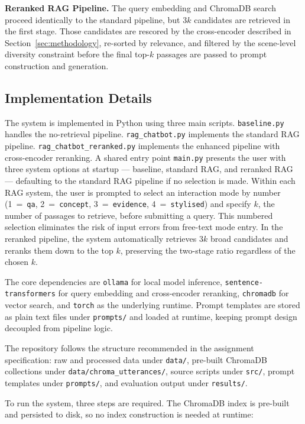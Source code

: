 \documentclass[10pt,conference]{IEEEtran}
\begin{document}
\textbf{Reranked RAG Pipeline.}
The query embedding and ChromaDB search proceed identically to the
standard pipeline, but $3k$ candidates are retrieved in the first
stage. Those candidates are rescored by the cross-encoder described
in Section~\ref{sec:methodology}, re-sorted by relevance, and
filtered by the scene-level diversity constraint before the final
top-$k$ passages are passed to prompt construction and generation.

\subsection{Implementation Details}

The system is implemented in Python using three main scripts.
\texttt{baseline.py} handles the no-retrieval pipeline.
\texttt{rag\_chatbot.py} implements the standard RAG pipeline.
\texttt{rag\_chatbot\_reranked.py} implements the enhanced pipeline
with cross-encoder reranking. A shared entry point \texttt{main.py}
presents the user with three system options at startup ---
baseline, standard RAG, and reranked RAG --- defaulting to the
standard RAG pipeline if no selection is made. Within each RAG
system, the user is prompted to select an interaction mode by
number (1~=~\texttt{qa}, 2~=~\texttt{concept}, 3~=~\texttt{evidence},
4~=~\texttt{stylised}) and specify $k$, the number of passages to
retrieve, before submitting a query. This numbered selection
eliminates the risk of input errors from free-text mode entry. In
the reranked pipeline, the system automatically retrieves $3k$
broad candidates and reranks them down to the top $k$, preserving
the two-stage ratio regardless of the chosen $k$.

The core dependencies are \texttt{ollama} for local model
inference, \texttt{sentence-transformers} for query embedding and
cross-encoder reranking, \texttt{chromadb} for vector search, and
\texttt{torch} as the underlying runtime. Prompt templates are
stored as plain text files under \texttt{prompts/} and loaded at
runtime, keeping prompt design decoupled from pipeline logic.

The repository follows the structure recommended in the assignment
specification: raw and processed data under \texttt{data/},
pre-built ChromaDB collections under
\texttt{data/chroma\_utterances/}, source scripts under
\texttt{src/}, prompt templates under \texttt{prompts/}, and
evaluation output under \texttt{results/}.

To run the system, three steps are required. The ChromaDB index is
pre-built and persisted to disk, so no index construction is needed
at runtime:
\end{document}
